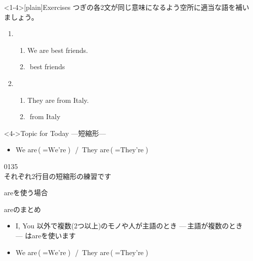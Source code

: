 \documentclass[aspectratio=169,xcolor={dvipsnames,table}]{beamer}
\begin{document}
%
%
\begin{frame}<1-4>[plain]{Exercises}
 つぎの各2文が同じ意味になるよう空所に適当な語を補いましょう。

\begin{enumerate}
 \item \begin{enumerate}
	\item We are best friends.
	\item {}\,\,best friends
       \end{enumerate}
 \item \begin{enumerate}
	\item They are from Italy.
	\item {}\,\,from Italy        \end{enumerate}
\end{enumerate}

\begin{block}<4->{Topic for Today ---短縮形---}
\begin{itemize}[square]
 \item We are\,($=\text{We're}$)\,\,\,\,/\,\,\,They are\,($=\text{They're}$)
\end{itemize}
     \end{block}


\hfill{\tiny 0135}\,{\scriptsize {}}\\
\hfill{\scriptsize それぞれ2行目の短縮形の練習です}

\end{frame}
\begin{frame}[plain]{areを使う場合}

\begin{block}{areのまとめ}
\begin{itemize}[square]
 \item   I, You 以外で複数(2つ以上)のモノや人が主語のとき\,\,---\,主語が複数のとき\,---\,\,はareを使います
 \item We are\,($=\text{We're}$)\,\,\,\,/\,\,\,They are\,($=\text{They're}$)
\end{itemize}  
     \end{block}


\end{frame}
\end{document}
